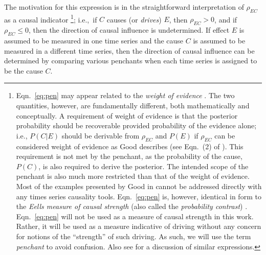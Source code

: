 \documentclass[twocolumn,aps,pre,groupedaddress]{revtex4-1}
\begin{document}
The motivation for this expression is in the straightforward interpretation of $\rho_{EC}$ as a causal indicator \footnote{Eqn.\ \ref{eq:pen} may appear related to the {\em weight of evidence} \cite{Good1984}.  The two quantities, however, are fundamentally different, both mathematically and conceptually.  A requirement of weight of evidence is that the posterior probability should be recoverable provided probability of the evidence alone; i.e., $P(C|E)$ should be derivable from $\rho_{EC}$ and $P(E)$ if $\rho_{EC}$ can be considered weight of evidence as Good describes (see Eqn.\ (2) of \cite{Good1984}).  This requirement is not met by the penchant, as the probability of the cause, $P(C)$, is also required to derive the posterior.  The intended scope of the penchant is also much more restricted than that of the weight of evidence.  Most of the examples presented by Good in \cite{Good1984} cannot be addressed directly with any times series causality tools.  Eqn.\ \ref{eq:pen} is, however, identical in form to the {\em Eells measure of causal strength} (also called the {\em probability contrast}) \cite{Illari2011}.  Eqn.\ \ref{eq:pen} will not be used as a measure of causal strength in this work.  Rather, it will be used as a measure indicative of driving without any concern for notions of the ``strength'' of such driving.  As such, we will use the term {\em penchant} to avoid confusion.  Also see \cite{kleinberg2012} for a discussion of similar expressions.}; i.e.,\ if $C$ causes (or {\em drives}) $E$, then $\rho_{EC} > 0$, and if $\rho_{EC} \le 0$, then the direction of causal influence is undetermined.  If effect $E$ is assumed to be measured in one time series and the cause $C$ is assumed to be measured in a different time series, then the direction of causal influence can be determined by comparing various penchants when each time series is assigned to be the cause $C$.  
\end{document}
